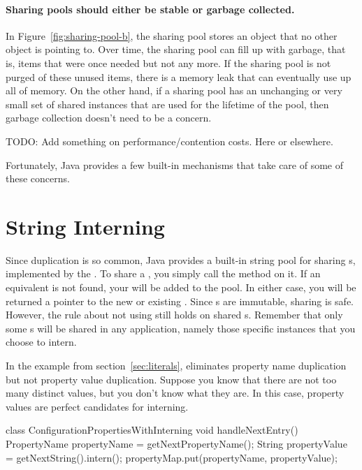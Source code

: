 \paragraph{Sharing pools should either be stable or garbage
collected.} In Figure~\ref{fig:sharing-pool-b}, the sharing pool stores an
object that no other object is pointing to. Over time, the sharing pool can fill up
with garbage, that is, items that were once needed but not any more. If the
sharing pool is not purged of these unused items, there is a memory
leak that can eventually use up all of memory. 
On the other hand, if a sharing pool has an unchanging or very small set of
shared instances that are used for the lifetime of the pool, then
garbage collection doesn't need to be a concern. 

TODO: Add something on performance/contention costs.  Here or elsewhere.

Fortunately, Java provides a few built-in mechanisms that take care of
some of these concerns.

\section{String Interning}
\label{sec:sharing-strings}


Since  duplication is so common, Java provides a built-in string
pool for sharing s, implemented by the \JRE. To share a
, you simply call the method  on it.  If an equivalent  is not found, your
 will be added to the pool. In either case, you will be returned a
pointer to the new or existing . 
Since s are immutable, sharing is safe. However,
the rule about not using \code{==} still holds on shared
s.  Remember that only some
s will be shared in any application, namely those specific
instances that you choose to intern.

In the example from section~\ref{sec:literals},
 eliminates property
name duplication but not
property value duplication. Suppose you know that there are
not too many distinct values, but you don't know what they are. In this case,
property values are perfect candidates for interning.
\begin{shortlisting}
 
 class ConfigurationPropertiesWithInterning {
    void handleNextEntry() {
       PropertyName propertyName = getNextPropertyName(); 
       String propertyValue = getNextString().intern();
       propertyMap.put(propertyName, propertyValue);
    }
}
\end{shortlisting}

